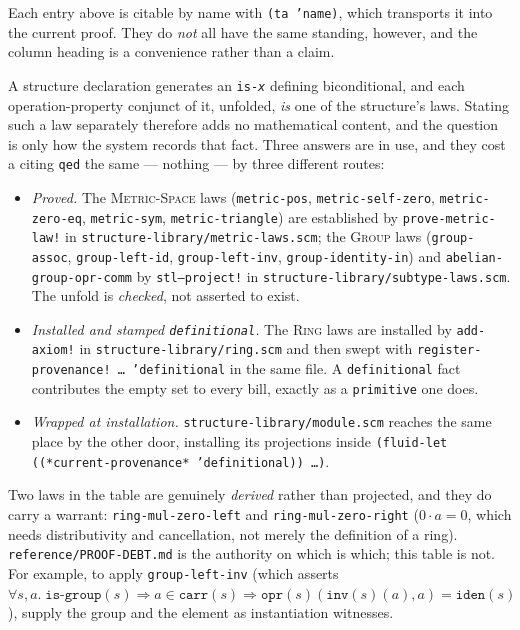 \begin{remark}
Each entry above is citable by name with \texttt{(ta 'name)}, which transports
it into the current proof.  They do \emph{not} all have the same standing,
however, and the column heading is a convenience rather than a claim.

A structure declaration generates an \texttt{is-\textit{x}} defining biconditional, and
each operation-property conjunct of it, unfolded, \emph{is} one of the
structure's laws.  Stating such a law separately therefore adds no mathematical
content, and the question is only how the system records that fact.  Three
answers are in use, and they cost a citing \texttt{qed} the same --- nothing ---
by three different routes:

\begin{itemize}
\item \emph{Proved.}  The \textsc{Metric-Space} laws (\texttt{metric-pos},
  \texttt{metric-self-zero}, \texttt{metric-zero-eq}, \texttt{metric-sym},
  \texttt{metric-triangle}) are established by \texttt{prove-metric-law!} in
  \texttt{structure-library/metric-laws.scm}; the \textsc{Group} laws
  (\texttt{group-assoc}, \texttt{group-left-id}, \texttt{group-left-inv},
  \texttt{group-identity-in}) and \texttt{abelian-group-opr-comm} by
  \texttt{stl--project!} in \texttt{structure-library/subtype-laws.scm}.  The
  unfold is \emph{checked}, not asserted to exist.
\item \emph{Installed and stamped \texttt{definitional}.}  The \textsc{Ring}
  laws are installed by \texttt{add-axiom!} in
  \texttt{structure-library/ring.scm} and then swept with
  \texttt{register-provenance!\ \ldots\ 'definitional} in the same file.  A
  \texttt{definitional} fact contributes the empty set to every bill, exactly as
  a \texttt{primitive} one does.
\item \emph{Wrapped at installation.}  \texttt{structure-library/module.scm}
  reaches the same place by the other door, installing its projections inside
  \texttt{(fluid-let ((*current-provenance* 'definitional)) \ldots)}.
\end{itemize}

Two laws in the table are genuinely \emph{derived} rather than projected, and
they do carry a warrant: \texttt{ring-mul-zero-left} and
\texttt{ring-mul-zero-right} ($0\cdot a = 0$, which needs distributivity and
cancellation, not merely the definition of a ring).
\texttt{reference/PROOF-DEBT.md} is the authority on which is which; this table
is not.  For example, to apply
\texttt{group-left-inv} (which asserts
$\forall s,a.\;\texttt{is-group}(s)\Rightarrow a\in\texttt{carr}(s)
 \Rightarrow \texttt{opr}(s)(\texttt{inv}(s)(a),a)=\texttt{iden}(s)$),
supply the group and the element as instantiation witnesses.
\end{remark}

